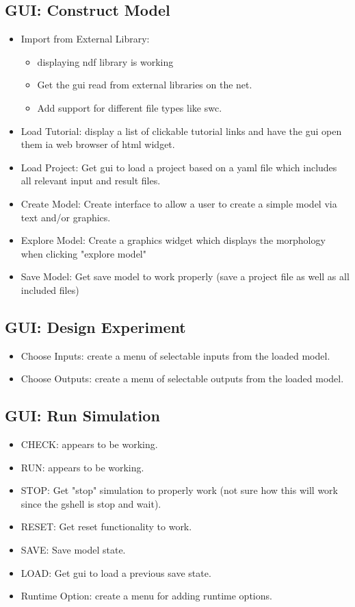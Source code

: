 \documentclass[12pt]{article}
\begin{document}
\subsection{GUI: Construct Model}

\begin{itemize}
\item Import from External Library:
  \begin{itemize}
  \item displaying ndf library is working
  \item Get the gui read from external libraries on the net.
  \item Add support for different file types like swc.
  \end{itemize}
\item Load Tutorial: display a list of clickable tutorial links and
  have the gui open them ia web browser of html widget.
\item Load Project: Get gui to load a project based on a yaml file
  which includes all relevant input and result files.
\item Create Model: Create interface to allow a user to create a
  simple model via text and/or graphics.
\item Explore Model: Create a graphics widget which displays the
  morphology when clicking "explore model"
\item Save Model: Get save model to work properly (save a project file
  as well as all included files)
\end{itemize}

\subsection{GUI: Design Experiment}
\begin{itemize}
\item Choose Inputs: create a menu of selectable inputs from the loaded model.
\item Choose Outputs: create a menu of selectable outputs from the loaded model.
\end{itemize}

\subsection{GUI: Run Simulation}
\begin{itemize}
\item CHECK: appears to be working.
\item RUN: appears to be working.      
\item STOP: Get "stop" simulation to properly work (not sure how this
  will work since the gshell is stop and wait).
\item RESET: Get reset functionality to work.
\item SAVE: Save model state.
\item LOAD: Get gui to load a previous save state.
\item Runtime Option: create a menu for adding runtime options.
\end{itemize}
\end{document}
